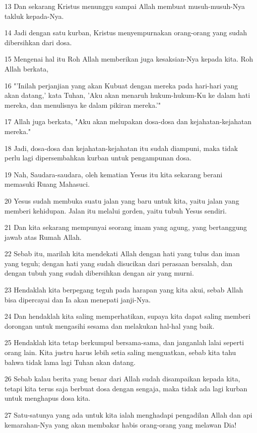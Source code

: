 \par 13 Dan sekarang Kristus menunggu sampai Allah membuat musuh-musuh-Nya takluk kepada-Nya.
\par 14 Jadi dengan satu kurban, Kristus menyempurnakan orang-orang yang sudah dibersihkan dari dosa.
\par 15 Mengenai hal itu Roh Allah memberikan juga kesaksian-Nya kepada kita. Roh Allah berkata,
\par 16 "'Inilah perjanjian yang akan Kubuat dengan mereka pada hari-hari yang akan datang,' kata Tuhan, 'Aku akan menaruh hukum-hukum-Ku ke dalam hati mereka, dan menulisnya ke dalam pikiran mereka.'"
\par 17 Allah juga berkata, "Aku akan melupakan dosa-dosa dan kejahatan-kejahatan mereka."
\par 18 Jadi, dosa-dosa dan kejahatan-kejahatan itu sudah diampuni, maka tidak perlu lagi dipersembahkan kurban untuk pengampunan dosa.
\par 19 Nah, Saudara-saudara, oleh kematian Yesus itu kita sekarang berani memasuki Ruang Mahasuci.
\par 20 Yesus sudah membuka suatu jalan yang baru untuk kita, yaitu jalan yang memberi kehidupan. Jalan itu melalui gorden, yaitu tubuh Yesus sendiri.
\par 21 Dan kita sekarang mempunyai seorang imam yang agung, yang bertanggung jawab atas Rumah Allah.
\par 22 Sebab itu, marilah kita mendekati Allah dengan hati yang tulus dan iman yang teguh; dengan hati yang sudah disucikan dari perasaan bersalah, dan dengan tubuh yang sudah dibersihkan dengan air yang murni.
\par 23 Hendaklah kita berpegang teguh pada harapan yang kita akui, sebab Allah bisa dipercayai dan Ia akan menepati janji-Nya.
\par 24 Dan hendaklah kita saling memperhatikan, supaya kita dapat saling memberi dorongan untuk mengasihi sesama dan melakukan hal-hal yang baik.
\par 25 Hendaklah kita tetap berkumpul bersama-sama, dan janganlah lalai seperti orang lain. Kita justru harus lebih setia saling menguatkan, sebab kita tahu bahwa tidak lama lagi Tuhan akan datang.
\par 26 Sebab kalau berita yang benar dari Allah sudah disampaikan kepada kita, tetapi kita terus saja berbuat dosa dengan sengaja, maka tidak ada lagi kurban untuk menghapus dosa kita.
\par 27 Satu-satunya yang ada untuk kita ialah menghadapi pengadilan Allah dan api kemarahan-Nya yang akan membakar habis orang-orang yang melawan Dia!
